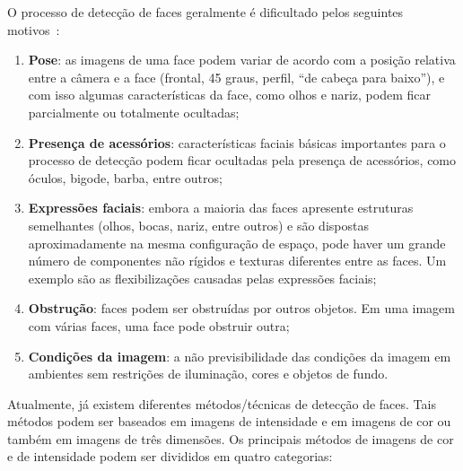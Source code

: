	O processo de detecção de faces geralmente é dificultado pelos seguintes
	motivos~\cite{oliveira, yang}:

	\begin{enumerate}
		\item \textbf{Pose}: as imagens de uma face podem variar de acordo com a posição
		relativa entre a câmera e a face (frontal, 45 graus, perfil, ``de cabeça para
		baixo''), e com isso algumas características da face, como olhos e nariz, podem
		ficar parcialmente ou totalmente ocultadas;
				 
		\item \textbf{Presença de acessórios}: características faciais básicas
		importantes para o processo de detecção podem ficar ocultadas pela presença de
		acessórios, como óculos, bigode, barba, entre outros;
		 
		\item \textbf{Expressões faciais}: embora a maioria das faces apresente
		estruturas semelhantes (olhos, bocas, nariz, entre outros) e são dispostas
		aproximadamente na mesma configuração de espaço, pode haver um grande número de
		componentes não rígidos e texturas diferentes entre as faces. Um exemplo são as
		flexibilizações causadas pelas expressões faciais;
				 
		\item \textbf{Obstrução}: faces podem ser obstruídas por outros objetos. Em uma
		imagem com várias faces, uma face pode obstruir outra;
		
		\item \textbf{Condições da imagem}: a não previsibilidade das condições da
		imagem em ambientes sem restrições de iluminação, cores e objetos de
		fundo.
	\end{enumerate}

	Atualmente, já existem diferentes métodos/técnicas de detecção de faces. Tais
	métodos podem ser baseados em imagens de intensidade e em imagens de cor ou
	também em imagens de três dimensões. Os principais métodos de imagens de cor e
	de intensidade podem ser divididos em quatro categorias:

